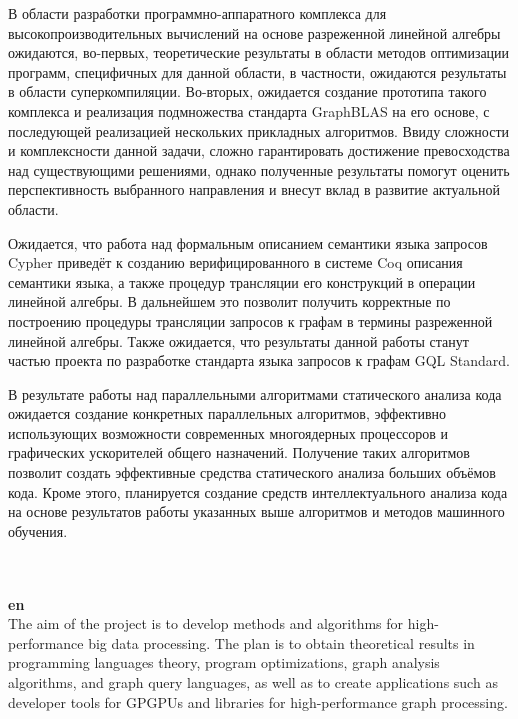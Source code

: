 \documentclass[12pt]{article}  %
\theoremstyle{remark}
\begin{document}
В области разработки программно-аппаратного комплекса для высокопроизводительных вычислений на основе разреженной линейной алгебры ожидаются, во-первых, теоретические результаты в области методов оптимизации программ, специфичных для данной области, в частности, ожидаются результаты в области суперкомпиляции. Во-вторых, ожидается создание прототипа такого комплекса и реализация подмножества стандарта GraphBLAS на его основе, с последующей реализацией нескольких прикладных алгоритмов. Ввиду сложности и комплексности данной задачи, сложно гарантировать достижение превосходства над существующими решениями, однако полученные результаты помогут оценить перспективность выбранного направления и внесут вклад в развитие актуальной области. 

Ожидается, что работа над формальным описанием семантики языка запросов Cypher приведёт к созданию верифицированного в системе Coq описания семантики языка, а также процедур трансляции его конструкций в операции линейной алгебры. В дальнейшем это позволит получить корректные по построению процедуры трансляции запросов к графам в термины разреженной линейной алгебры. Также ожидается, что результаты данной работы станут частью проекта по разработке стандарта языка запросов к графам GQL Standard. 

В результате работы над параллельными алгоритмами статического анализа кода ожидается создание конкретных параллельных алгоритмов, эффективно использующих возможности современных многоядерных процессоров и графических ускорителей общего назначений. Получение таких алгоритмов позволит создать эффективные средства статического анализа больших объёмов кода. Кроме этого, планируется создание средств интеллектуального анализа кода на основе результатов работы указанных выше алгоритмов и методов машинного обучения.

\\
\\
\textbf{en}\\

The aim of the project is to develop methods and algorithms for high-performance big data processing. 
The plan is to obtain theoretical results in programming languages theory, program optimizations, graph analysis algorithms, and graph query languages, as well as to create applications such as developer tools for GPGPUs and libraries for high-performance graph processing. 
\end{document}
